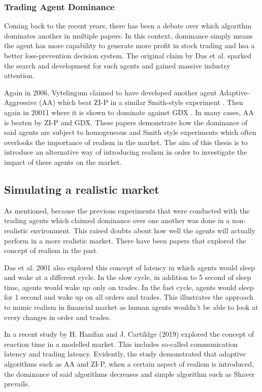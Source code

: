 \subsubsection{Trading Agent Dominance}
Coming back to the recent years, there has been a debate over which algorithm dominates another in multiple papers. In this context, dominance simply means the agent has more capability to generate more profit in stock trading and hsa a better loss-prevention decision system. The original claim by Das et al. sparked the search and development for such agents and gained massive industry attention. 

Again in 2006, Vytelingum claimed to have developed another agent Adaptive-Aggressive (AA) which beat ZI-P in a similar Smith-style experiment \cite{AA2006}. Then again in 20011 where it is shown to dominate against GDX \cite{deluca2011}. In many cases, AA is beaten by ZI-P and GDX. These papers demonstrate how the dominance of said agents are subject to homogeneous and Smith style experiments which often overlooks the importance of realism in the market. The aim of this thesis is to introduce an alternative way of introducing realism in order to investigate the impact of these agents on the market. 

\subsection{Simulating a realistic market}
As mentioned, because the previous experiments that were conducted with the trading agents which claimed dominance over one another was done in a non-realistic environment. This raised doubts about how well the agents will actually perform in a more realistic market. There have been papers that explored the concept of realism in the past. 

Das et al. 2001 \cite{das2001} also explored this concept of latency in which agents would sleep and wake at a different cycle. In the slow cycle, in addition to 5 second of sleep time, agents would wake up only on trades. In the fast cycle, agents would sleep for 1 second and wake up on all orders and trades. This illustrates the approach to mimic realism in financial market as human agents wouldn’t be able to look at every changes in order and trades. 

In a recent study by H. Hanifan and J. Cartildge (2019) \cite{foolsrush} explored the concept of reaction time in a modelled market. This includes so-called communication latency and trading latency. Evidently, the study demonstrated that adaptive algorithms such as AA and ZI-P, when a certain aspect of realism is introduced, the dominance of said algorithms decreases and simple algorithm such as Shaver prevails. 

